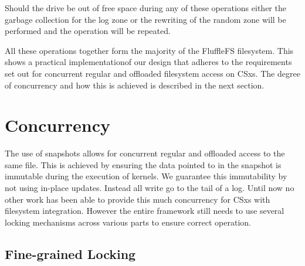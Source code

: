 Should the drive be out of free space during any of these operations either the
garbage collection for the log zone or the rewriting of the random zone will
be performed and the operation will be repeated.

All these operations together form the majority of the FluffleFS filesystem.
This shows a practical implementation\footnotemark[15] of our design that adheres
to the requirements set out for concurrent regular and offloaded filesystem
access on CSxs. The degree of concurrency and how this is achieved is described
in the next section.




\section{Concurrency}

The use of snapshots allows for concurrent regular and offloaded access to the
same file. This is achieved by ensuring the data pointed to in the snapshot
is immutable during the execution of kernels. We guarantee this immutability by
not using in-place updates. Instead all write go to the tail of a log. Until now
no other work has been able to provide this much concurrency for CSxs with
filesystem integration. However the entire framework still needs to use several
locking mechanisms across various parts to ensure correct operation.

\subsection{Fine-grained Locking}

